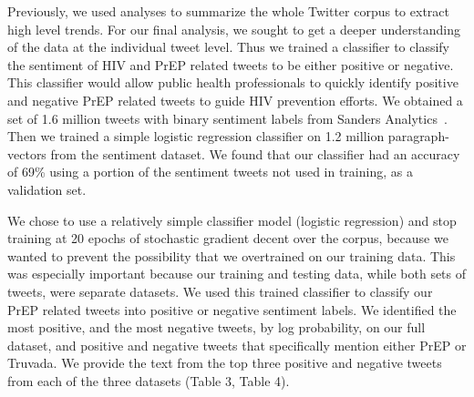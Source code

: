 \documentclass{sig-alternate-05-2015}
\begin{document}
Previously, we used analyses to summarize the whole Twitter corpus to extract high level trends. For our final analysis, we sought to get a deeper understanding of the data at the individual tweet level. Thus we trained a classifier to classify the sentiment of HIV and PrEP related tweets to be either positive or negative. This classifier would allow public health professionals to quickly identify positive and negative PrEP related tweets to guide HIV prevention efforts. We obtained a set of 1.6 million tweets with binary sentiment labels from Sanders Analytics~\cite{sentimentdata}. Then we trained a simple logistic regression classifier on 1.2 million paragraph-vectors from the sentiment dataset. We found that our classifier had an accuracy of 69\% using a portion of the sentiment tweets not used in training, as a validation set.

We chose to use a relatively simple classifier model (logistic regression) and stop training at 20 epochs of stochastic gradient decent over the corpus, because we wanted to prevent the possibility that we overtrained on our training data. This was especially important because our training and testing data, while both sets of tweets, were separate datasets. We used this trained classifier to classify our PrEP related tweets into positive or negative sentiment labels. We identified the most positive, and the most negative tweets, by log probability, on our full dataset, and positive and negative tweets that specifically mention either PrEP or Truvada. We provide the text from the top three positive and negative tweets from each of the three datasets (Table 3, Table 4).
\end{document}
